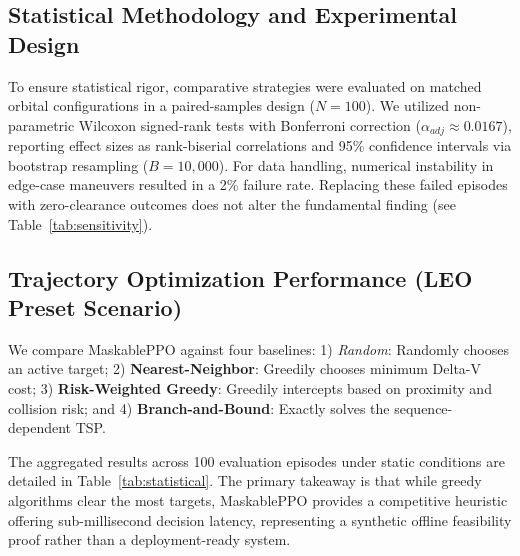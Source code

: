 \documentclass[10pt,conference,a4paper]{IEEEtran}
\begin{document}
\subsection{Statistical Methodology and Experimental Design}
To ensure statistical rigor, comparative strategies were evaluated on matched orbital configurations in a paired-samples design ($N=100$). We utilized non-parametric Wilcoxon signed-rank tests \cite{pratt1959} with Bonferroni correction ($\alpha_{adj} \approx 0.0167$), reporting effect sizes as rank-biserial correlations \cite{cohen1988} and 95\% confidence intervals via bootstrap resampling \cite{efron1993} ($B=10,000$). 
For data handling, numerical instability in edge-case maneuvers resulted in a 2\% failure rate. Replacing these failed episodes with zero-clearance outcomes does not alter the fundamental finding (see Table~\ref{tab:sensitivity}).

\begin{table}[htbp]
\caption{Sensitivity Analysis: Impact of Failed Episode Treatment}
\label{tab:sensitivity}
\footnotesize
\begin{center}
\end{center}
\end{table}

\subsection{Trajectory Optimization Performance (LEO Preset Scenario)}
We compare MaskablePPO against four baselines: 1) \textit{Random}: Randomly chooses an active target; 2) \textbf{Nearest-Neighbor}: Greedily chooses minimum Delta-V cost; 3) \textbf{Risk-Weighted Greedy}: Greedily intercepts based on proximity and collision risk; and 4) \textbf{Branch-and-Bound}: Exactly solves the sequence-dependent TSP.

The aggregated results across 100 evaluation episodes under static conditions are detailed in Table~\ref{tab:statistical}. The primary takeaway is that while greedy algorithms clear the most targets, MaskablePPO provides a competitive heuristic offering sub-millisecond decision latency, representing a synthetic offline feasibility proof rather than a deployment-ready system.
\end{document}
